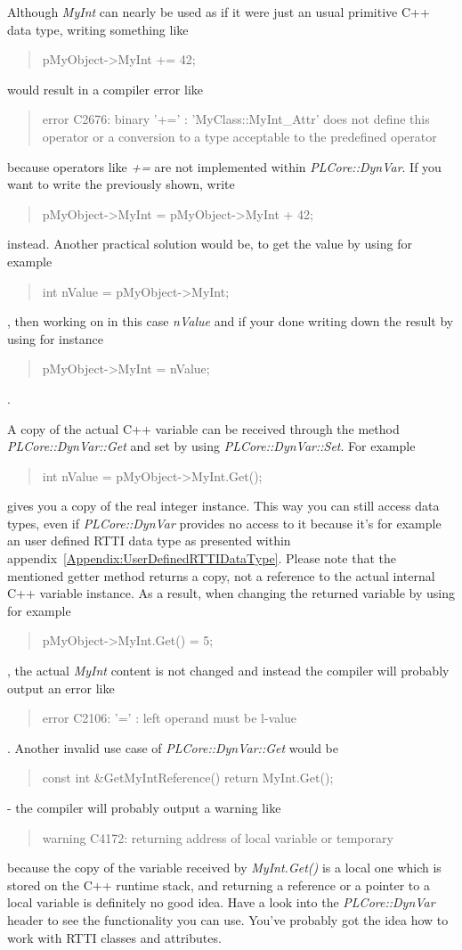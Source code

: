 Although \emph{MyInt} can nearly be used as if it were just an usual primitive C++ data type, writing something like \begin{quote}pMyObject->MyInt += 42;\end{quote} would result in a compiler error like \begin{quote}error C2676: binary '+=' : 'MyClass::MyInt\_Attr' does not define this operator or a conversion to a type acceptable to the predefined operator\end{quote} because operators like \emph{+=} are not implemented within \emph{PLCore::DynVar}. If you want to write the previously shown, write \begin{quote}pMyObject->MyInt = pMyObject->MyInt + 42;\end{quote} instead. Another practical solution would be, to get the value by using for example \begin{quote}int nValue = pMyObject->MyInt;\end{quote}, then working on in this case \emph{nValue} and if your done writing down the result by using for instance \begin{quote}pMyObject->MyInt = nValue;\end{quote}.

A copy of the actual C++ variable can be received through the method \emph{PLCore::DynVar::Get} and set by using \emph{PLCore::DynVar::Set}. For example \begin{quote}int nValue = pMyObject->MyInt.Get();\end{quote} gives you a copy of the real integer instance. This way you can still access data types, even if \emph{PLCore::DynVar} provides no access to it because it's for example an user defined RTTI data type as presented within appendix~\ref{Appendix:UserDefinedRTTIDataType}. Please note that the mentioned getter method returns a copy, not a reference to the actual internal C++ variable instance. As a result, when changing the returned variable by using for example \begin{quote}pMyObject->MyInt.Get() = 5;\end{quote}, the actual \emph{MyInt} content is not changed and instead the compiler will probably output an error like \begin{quote}error C2106: '=' : left operand must be l-value\end{quote}. Another invalid use case of \emph{PLCore::DynVar::Get} would be \begin{quote}const int \&GetMyIntReference() { return MyInt.Get(); }\end{quote} - the compiler will probably output a warning like \begin{quote}warning C4172: returning address of local variable or temporary\end{quote} because the copy of the variable received by \emph{MyInt.Get()} is a local one which is stored on the C++ runtime stack, and returning a reference or a pointer to a local variable is definitely no good idea. Have a look into the \emph{PLCore::DynVar} header to see the functionality you can use. You've probably got the idea how to work with RTTI classes and attributes.


